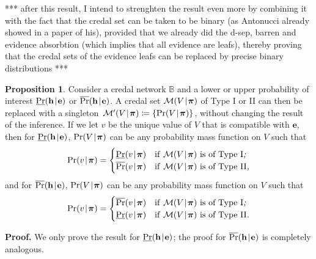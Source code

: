 \documentclass[10pt,a4paper]{paper}
\theoremstyle{definition}
\newtheorem{prop}[theorem]{Proposition}
\newcommand{\vbpi}{\boldsymbol\pi}
\newcommand{\hyp}{\mathbf{h}}
\newcommand{\ev}{\mathbf{e}}
\newcommand{\credal}{\mathcal{M}}
\newcommand{\newmid}{\hspace{0.9pt}\vert\hspace{0.9pt}}
\begin{document}
{\color{red}*** after this result, I intend to strenghten the result even more by combining it with the fact that the credal set can be taken to be binary (as Antonucci already showed in a paper of his), provided that we already did the d-sep, barren and evidence absorbtion (which implies that all evidence are leafs), thereby proving that the credal sets of the evidence leafs can be replaced by precise binary distributions ***}

\begin{prop}\label{prop:credalTypeIorII}
Consider a credal network ${\mathbb B}$ and a lower or upper probability of interest $\underline{\Pr}(\hyp\newmid\ev)$ or $\overline{\Pr}(\hyp\newmid\ev)$. A credal set $\credal(V\newmid \vbpi)$ of\/ Type I or II can then be replaced with a singleton~$\credal'(V\newmid \vbpi)\coloneqq\{\Pr(V\newmid\vbpi)\}$, without changing the result of the inference. If we let $v$ be the unique value of\/ $V$ that is compatible with $\ev$, then for $\underline{\Pr}(\hyp\newmid\ev)$, $\Pr(V\newmid\vbpi)$ can be any probability mass function on $V$ such that
\begin{equation*}
\Pr(v\newmid\vbpi)
=
\begin{cases}
\underline{\Pr}(v\newmid\vbpi)
& \text{if\/ $\credal(V\newmid\vbpi)$ is of Type I\emph{;}}\\
\overline{\Pr}(v\newmid\vbpi)
& \text{if\/ $\credal(V\newmid\vbpi)$ is of Type II\emph{,}}
\end{cases}
\end{equation*}
and for $\overline{\Pr}(\hyp\newmid\ev)$, $\Pr(V\newmid\vbpi)$ can be any probability mass function on $V$ such that
\vspace{-4pt}
\begin{equation*}
\Pr(v\newmid\vbpi)
=
\begin{cases}
\overline{\Pr}(v\newmid\vbpi)
& \text{if\/ $\credal(V\newmid\vbpi)$ is of Type I\emph{;}}\\
\underline{\Pr}(v\newmid\vbpi)
& \text{if\/ $\credal(V\newmid\vbpi)$ is of Type II\emph{.}}
\end{cases}
\end{equation*}
\end{prop}
{\bf Proof.}
We only prove the result for $\underline{\Pr}(\hyp\newmid\ev)$; the proof for $\overline{\Pr}(\hyp\newmid\ev)$ is completely analogous.
\end{document}
